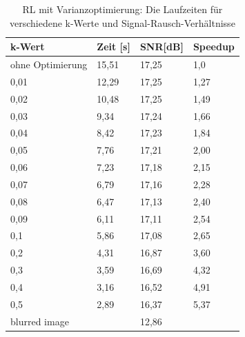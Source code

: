 \documentclass[a4paper,12pt]{article}
\begin{document}
\begin{table}[htbp]
\begin{center}
\begin{tabular}{ | l | l | l | l |}
\hline
k-Wert 			& Zeit [s] & SNR[dB] & Speedup \\ \hline
ohne Optimierung & 	15,51 & 17,25	 & 	1,0 	\\ \hline
0,01			&	12,29 & 17,25    &  1,27\\
0,02			&	10,48 & 17,25    & 	1,49\\
0,03			&	9,34  & 17,24    & 	1,66\\
0,04			&	8,42  & 17,23    & 	1,84\\
0,05			&	7,76  & 17,21    & 	2,00\\
0,06			&	7,23  & 17,18    & 	2,15\\ 
0,07			&	6,79  & 17,16    & 	2,28\\
0,08			&	6,47  & 17,13    & 	2,40\\
0,09			&	6,11  & 17,11    & 	2,54\\
0,1				&	5,86  & 17,08    & 	2,65\\
0,2				&	4,31  & 16,87    & 	3,60\\
0,3				&	3,59  & 16,69    & 	4,32\\
0,4				&   3,16  & 16,52    & 	4,91\\
0,5				&	2,89  & 16,37    & 	5,37\\ \hline

blurred image	&		  & 12,86 & \\
\hline
\end{tabular}
\caption{RL mit Varianzoptimierung: Die Laufzeiten für verschiedene k-Werte und
Signal-Rausch-Verhältnisse}
\label{tab:konv_time_SNR_RL}
\end{center}
\end{table}
\end{document}
